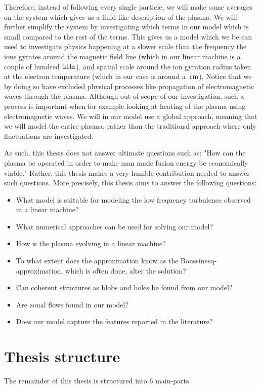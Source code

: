 Therefore, instead of following every single particle, we will make some averages on the system which gives us a fluid like description of the plasma.
We will further simplify the system by investigating which terms in our model which is small compared to the rest of the terms.
This gives us a model which we be can used to investigate physics happening at a slower scale than the frequency the ions gyrates around the magnetic field line (which in our linear machine is a couple of hundred $\, \text{kHz}$), and spatial scale around the ion gyration radius taken at the electron temperature (which in our case is around a $\, \text{cm}$).
Notice that we by doing so have excluded physical processes like propagation of electromagnetic waves through the plasma.
Although out of scope of our investigation, such a process is important when for example looking at heating of the plasma using electromagnetic waves.
We will in our model use a global approach, meaning that we will model the entire plasma, rather than the traditional approach where only fluctuations are investigated.

As such, this thesis does not answer ultimate questions such as:
"How can the plasma be operated in order to make man made fusion energy be economically viable."
Rather, this thesis makes a very humble contribution needed to answer such questions.
More precisely, this thesis aims to answer the following questions:
%
\begin{itemize}[noitemsep]
    \item What model is suitable for modeling the low frequency turbulence observed in a linear machine?
    \item What numerical approaches can be used for solving our model?
    \item How is the plasma evolving in a linear machine?
    \item To what extent does the approximation know as the Boussinesq-approximation, which is often done, alter the solution?
    \item Can coherent structures as blobs and holes be found from our model?
    \item Are zonal flows found in our model?
    \item Does our model capture the features reported in the literature?
\end{itemize}



\section{Thesis structure}
%
The remainder of this thesis is structured into $6$ main-parts.

